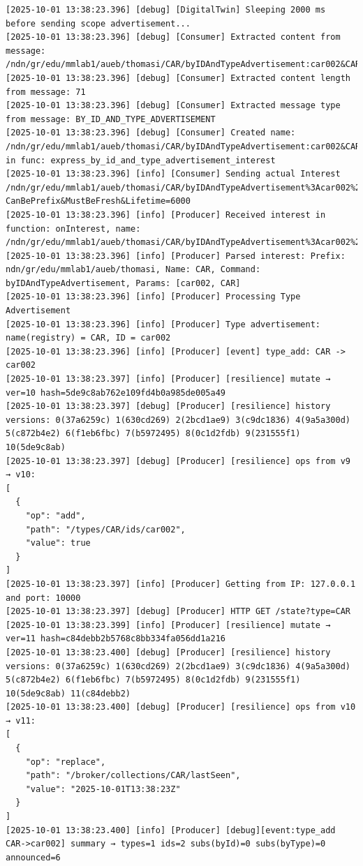 \documentclass{article}
\begin{document}
\begin{lstlisting}[language=log, caption={Producer SeEDS Service logs after publishing \textit{@ids=car001,car002} to the \textit{@type=CAR} registry}, label={lst:publish-to-registry}]
[2025-10-01 13:38:23.396] [debug] [DigitalTwin] Sleeping 2000 ms before sending scope advertisement...
[2025-10-01 13:38:23.396] [debug] [Consumer] Extracted content from message: /ndn/gr/edu/mmlab1/aueb/thomasi/CAR/byIDAndTypeAdvertisement:car002&CAR
[2025-10-01 13:38:23.396] [debug] [Consumer] Extracted content length from message: 71
[2025-10-01 13:38:23.396] [debug] [Consumer] Extracted message type from message: BY_ID_AND_TYPE_ADVERTISEMENT
[2025-10-01 13:38:23.396] [debug] [Consumer] Created name: /ndn/gr/edu/mmlab1/aueb/thomasi/CAR/byIDAndTypeAdvertisement:car002&CAR in func: express_by_id_and_type_advertisement_interest
[2025-10-01 13:38:23.396] [info] [Consumer] Sending actual Interest /ndn/gr/edu/mmlab1/aueb/thomasi/CAR/byIDAndTypeAdvertisement%3Acar002%26CAR?CanBePrefix&MustBeFresh&Lifetime=6000
[2025-10-01 13:38:23.396] [info] [Producer] Received interest in function: onInterest, name: /ndn/gr/edu/mmlab1/aueb/thomasi/CAR/byIDAndTypeAdvertisement%3Acar002%26CAR
[2025-10-01 13:38:23.396] [info] [Producer] Parsed interest: Prefix: ndn/gr/edu/mmlab1/aueb/thomasi, Name: CAR, Command: byIDAndTypeAdvertisement, Params: [car002, CAR]
[2025-10-01 13:38:23.396] [info] [Producer] Processing Type Advertisement
[2025-10-01 13:38:23.396] [info] [Producer] Type advertisement: name(registry) = CAR, ID = car002
[2025-10-01 13:38:23.396] [info] [Producer] [event] type_add: CAR -> car002
[2025-10-01 13:38:23.397] [info] [Producer] [resilience] mutate → ver=10 hash=5de9c8ab762e109fd4b0a985de005a49
[2025-10-01 13:38:23.397] [debug] [Producer] [resilience] history versions: 0(37a6259c) 1(630cd269) 2(2bcd1ae9) 3(c9dc1836) 4(9a5a300d) 5(c872b4e2) 6(f1eb6fbc) 7(b5972495) 8(0c1d2fdb) 9(231555f1) 10(5de9c8ab) 
[2025-10-01 13:38:23.397] [debug] [Producer] [resilience] ops from v9 → v10:
[
  {
    "op": "add",
    "path": "/types/CAR/ids/car002",
    "value": true
  }
]
[2025-10-01 13:38:23.397] [info] [Producer] Getting from IP: 127.0.0.1 and port: 10000
[2025-10-01 13:38:23.397] [debug] [Producer] HTTP GET /state?type=CAR
[2025-10-01 13:38:23.399] [info] [Producer] [resilience] mutate → ver=11 hash=c84debb2b5768c8bb334fa056dd1a216
[2025-10-01 13:38:23.400] [debug] [Producer] [resilience] history versions: 0(37a6259c) 1(630cd269) 2(2bcd1ae9) 3(c9dc1836) 4(9a5a300d) 5(c872b4e2) 6(f1eb6fbc) 7(b5972495) 8(0c1d2fdb) 9(231555f1) 10(5de9c8ab) 11(c84debb2) 
[2025-10-01 13:38:23.400] [debug] [Producer] [resilience] ops from v10 → v11:
[
  {
    "op": "replace",
    "path": "/broker/collections/CAR/lastSeen",
    "value": "2025-10-01T13:38:23Z"
  }
]
[2025-10-01 13:38:23.400] [info] [Producer] [debug][event:type_add CAR->car002] summary → types=1 ids=2 subs(byId)=0 subs(byType)=0 announced=6

\end{lstlisting}
\end{document}
